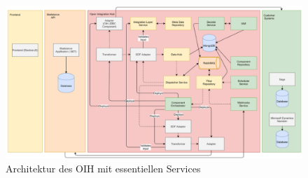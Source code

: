 \begin{figure}[!h]
\centering
\includegraphics[width=15cm]{images/0x_implementation_possibilities/opt3.png}
\caption{Architektur des OIH mit essentiellen Services}
\label{fig:Architektur des OIH mit essentiellen Services}
\end{figure}

